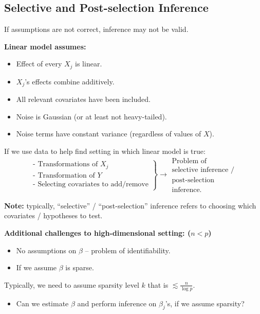 \subsection{Selective and Post-selection Inference}
If assumptions are not correct, inference may not be valid.

\textbf{Linear model assumes:}
\begin{itemize}
    \item Effect of every $X_j$ is linear.
    \item $X_j$'s effects combine additively.
    \item All relevant covariates have been included.
    \item Noise is Gaussian (or at least not heavy-tailed).
    \item Noise terms have constant variance (regardless of values of $X$).
\end{itemize}

If we use data to help find setting in which linear model is true:
\[ 
\left.
\begin{array}{l}
\text{- Transformations of } X_j \\
\text{- Transformation of } Y \\
\text{- Selecting covariates to add/remove}
\end{array}
\right\} \to \begin{array}{c} \text{Problem of} \\ \text{selective inference /} \\ \text{post-selection} \\ \text{inference.} \end{array}
\]

\textbf{Note:} typically, ``selective'' / ``post-selection'' inference refers to choosing which covariates / hypotheses to test.

\textbf{Additional challenges to high-dimensional setting: ($n < p$)}
\begin{itemize}
    \item No assumptions on $\beta$ -- problem of identifiability.
    \item If we assume $\beta$ is sparse.
\end{itemize}

Typically, we need to assume sparsity level $k$ that is $\lesssim \frac{n}{\log p}$.
\begin{itemize}
    \item[$\hookrightarrow$] Can we estimate $\beta$ and perform inference on $\beta_j$'s, if we assume sparsity?
\end{itemize}

